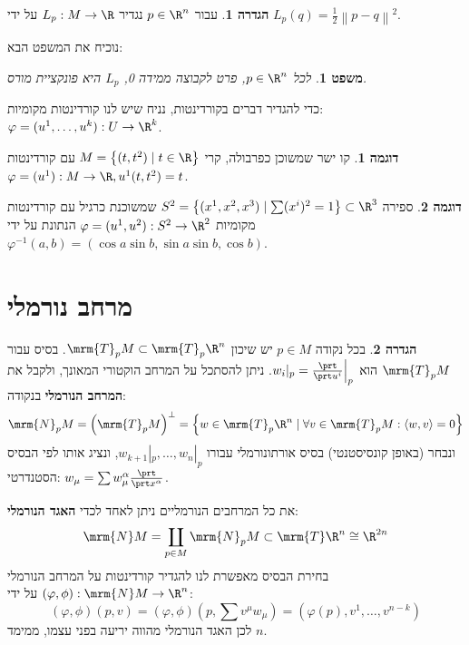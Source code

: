 \documentclass{article}
\newtheorem*{theorem*}{משפט}
\theoremstyle{definition}
\newtheorem*{definition*}{הגדרה}
\newtheorem*{example*}{דוגמה}
\newcommand{\norm}[1]{\left\lVert#1\right\rVert}
\begin{document}
	\begin{definition*}
		עבור
		\(p\in \R^n\)
		נגדיר
		\(L_p:M\to \R\)
		על ידי
		\(L_p(q)=\frac{1}{2}\norm{p-q}^2\).
	\end{definition*}

	נוכיח את המשפט הבא:
	\begin{theorem*}
		לכל
		\(p\in \R^n\),
		פרט לקבוצה ממידה 0, \(L_p\) היא פונקציית מורס.
	\end{theorem*}

	כדי להגדיר דברים בקורדינטות, נניח שיש לנו קורדינטות מקומיות:
	\(\varphi=(u^1,\dotsc,u^k): U \to \R^k\).
	
	\begin{example*}
		קו ישר שמשוכן כפרבולה, קרי
		\(M = \left\{ (t,t^2)\mid t \in \R \right\}\)
		עם קורדינטות
		\(\varphi=(u^1): M \to \R, u^1(t,t^2)=t\).
	\end{example*}
	
	\begin{example*}
		ספירה
		\(S^2 = \left\{(x^1,x^2,x^3) \mid \sum (x^i)^2 = 1 \right\} \subset \R^3 \)
		שמשוכנת כרגיל עם קורדינטות מקומיות
		\(\varphi=(u^1,u^2): S^2 \to \R^2\)
		הנתונת על ידי
		\(
			\varphi^{-1}(a, b) = \left(
				\cos a \sin b,
				\sin a \sin b,
				\cos b
			\right)
		\).
	\end{example*}




	\section{מרחב נורמלי}
	
	\begin{definition*}
		בכל נקודה
		$p\in M$
		יש שיכון
		\(\mrm{T}_p M \subset \mrm{T}_p \R^n\).
		בסיס עבור
		\(\mrm{T}_p M\)
		הוא
		\(w_i|_p=\frac{\prt}{\prt u^i}\Big|_p\).
		ניתן להסתכל על המרחב הוקטורי המאונך, ולקבל את \textbf{המרחב הנורמלי} בנקודה:
		\[
			\mrm{N}_p M
			= \left(\mrm{T}_p M\right)^\bot
			= \left\{
				w \in \mrm{T}_p \R^n
				\mid
				\forall v \in \mrm{T}_p M: \langle w,v \rangle=0
			\right\}
		\]
		ונבחר (באופן קונסיסטנטי) בסיס אורתונורמלי עבורו
		\(w_{k+1}|_p,\dotsc,w_{n}|_p\),
		ונציג אותו לפי הבסיס הסטנדרטי:
		\(w_\mu = \sum w^\alpha_\mu \frac{\prt}{\prt x^\alpha}\).
		
		את כל המרחבים הנורמליים ניתן לאחד לכדי \textbf{האגד הנורמלי}:
		\[
			\mrm{N} M
			= \coprod_{p \in M} \mrm{N}_p M
			\subset \mrm{T} \R^n
			\cong \R^{2n}
		\]
		בחירת הבסיס מאפשרת לנו להגדיר קורדינטות על המרחב הנורמלי
		\((\varphi,\phi): \mrm{N} M \to \R^n\)
		על ידי:
		\[
			(\varphi,\phi)(p,v)
			= (\varphi,\phi)(p,\sum v^\mu w_\mu)
			= (\varphi(p),v^1,\dotsc,v^{n-k})
		\]
		לכן האגד הנורמלי מהווה יריעה בפני עצמו, ממימד \(n\).
	\end{definition*}
\end{document}
